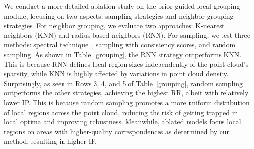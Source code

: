 \begin{table}[htbp]
    \centering
    \caption{Ablation study on prior-guided local grouping. }
    \label{grouping}
\end{table}

We conduct a more detailed ablation study on the prior-guided local grouping module, focusing on two aspects: sampling strategies and neighbor grouping strategies. For neighbor grouping, we evaluate two approaches: K-nearest neighbors (KNN) and radius-based neighbors (RNN). For sampling, we test three methods: spectral technique~\cite{leordeanu2005spectral}, sampling with consistency scores, and random sampling.
As shown in Table~\ref{grouping}, the RNN strategy outperforms KNN. 
This is because RNN defines local region sizes independently of the point cloud's sparsity, while KNN is highly affected by variations in point cloud density. Surprisingly, as seen in Rows 3, 4, and 5 of Table~\ref{grouping}, random sampling outperforms the other strategies, achieving the highest RR, albeit with relatively lower IP. This is because random sampling promotes a more uniform distribution of local regions across the point cloud, reducing the risk of getting trapped in local optima and improving robustness. Meanwhile, ablated models focus local regions on areas with higher-quality correspondences as determined by our method, resulting in higher IP.


